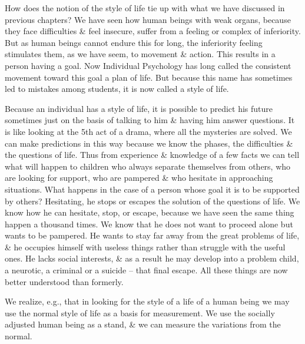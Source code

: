 \documentclass{article}
\numberwithin{equation}{section}
\begin{document}
How does the notion of the style of life tie up with what we have discussed in previous chapters? We have seen how human beings with weak organs, because they face difficulties \& feel insecure, suffer from a feeling or complex of inferiority. But as human beings cannot endure this for long, the inferiority feeling stimulates them, as we have seem, to movement \& action. This results in a person having a goal. Now Individual Psychology has long called the consistent movement toward this goal a plan of life. But because this name has sometimes led to mistakes among students, it is now called a style of life.

Because an individual has a style of life, it is possible to predict his future sometimes just on the basis of talking to him \& having him answer questions. It is like looking at the 5th act of a drama, where all the mysteries are solved. We can make predictions in this way because we know the phases, the difficulties \& the questions of life. Thus from experience \& knowledge of a few facts we can tell what will happen to children who always separate themselves from others, who are looking for support, who are pampered \& who hesitate in approaching situations. What happens in the case of a person whose goal it is to be supported by others? Hesitating, he stops or escapes the solution of the questions of life. We know how he can hesitate, stop, or escape, because we have seen the same thing happen a thousand times. We know that he does not want to proceed alone but wants to be pampered. He wants to stay far away from the great problems of life, \& he occupies himself with useless things rather than struggle with the useful ones. He lacks social interests, \& as a result he may develop into a problem child, a neurotic, a criminal or a suicide -- that final escape. All these things are now better understood than formerly.

We realize, e.g., that in looking for the style of a life of a human being we may use the normal style of life as a basis for measurement. We use the socially adjusted human being as a stand, \& we can measure the variations from the normal.
\end{document}
